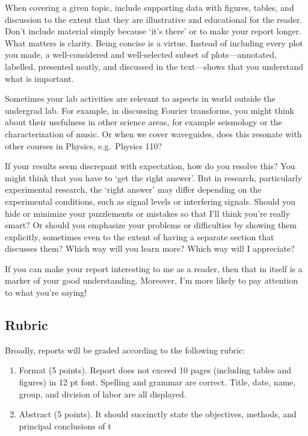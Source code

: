 \documentclass[12pt,preprint]{aastex}
\begin{document}
When covering a given topic, include supporting data with figures,
 tables, and discussion to the extent that they are illustrative and
 educational for the reader. Don't include material simply because `it's
 there' or to make your report longer. What matters is clarity. Being concise is a virtue. Instead of including every
 plot you made, a well-considered and
 well-selected subset of plots---annotated, labelled, presented neatly, and
discussed in the text---shows that you understand what is important.

Sometimes your lab activities are relevant to aspects in world outside
 the undergrad lab. For example, in discussing Fourier transforms, you
 might think about their usefulness in other science areas, for example
 seismology or the characterization of music. Or when we cover
 waveguides, does this resonate with other courses in Physics,
 e.g.\ Physics 110?

If your results seem discrepant with expectation, how do you resolve
this? You might think that  you have to `get the right answer'. But in
research, particularly experimental research, the `right answer' may
differ depending on the experimental conditions, such as signal levels
or interfering signals. Should you hide or minimize your puzzlements or
mistakes so that I'll think you're really smart? Or should you emphasize
your problems or difficulties  by showing them explicitly, sometimes
even to the extent of having a separate section that discusses them?
Which way will you learn more? Which way will I appreciate?

If you can make your report interesting to me as a reader, then that in
 itself is a marker of your good understanding. Moreover, I'm more
 likely to pay attention to what you're saying!
 
 \subsection{Rubric}
 
 Broadly, reports will be graded according to the following rubric:
 \begin{enumerate}
     \item Format (5 points). Report does not exceed 10 pages (including tables and figures) in 12 pt font. Spelling and grammar are correct. Title, date, name, group, and division of labor are all displayed.
     \item Abstract (5 points). It should succinctly state the objectives, methods, and principal conclusions of t
 \end{enumerate}
\end{document}
